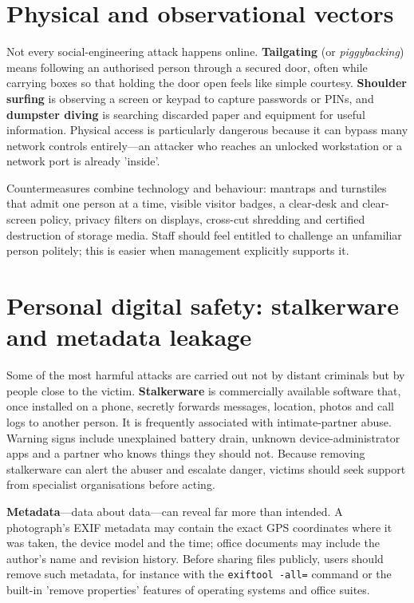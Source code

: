 \section{Physical and observational vectors}\label{sec:5.3}
Not every social-engineering attack happens online. \textbf{Tailgating} (or \emph{piggybacking}) means following an authorised person through a secured door, often while carrying boxes so that holding the door open feels like simple courtesy. \textbf{Shoulder surfing} is observing a screen or keypad to capture passwords or PINs, and \textbf{dumpster diving} is searching discarded paper and equipment for useful information. Physical access is particularly dangerous because it can bypass many network controls entirely—an attacker who reaches an unlocked workstation or a network port is already 'inside'.

Countermeasures combine technology and behaviour: mantraps and turnstiles that admit one person at a time, visible visitor badges, a clear-desk and clear-screen policy, privacy filters on displays, cross-cut shredding and certified destruction of storage media. Staff should feel entitled to challenge an unfamiliar person politely; this is easier when management explicitly supports it.

\section{Personal digital safety: stalkerware and metadata leakage}\label{sec:5.4}
Some of the most harmful attacks are carried out not by distant criminals but by people close to the victim. \textbf{Stalkerware} is commercially available software that, once installed on a phone, secretly forwards messages, location, photos and call logs to another person. It is frequently associated with intimate-partner abuse. Warning signs include unexplained battery drain, unknown device-administrator apps and a partner who knows things they should not. Because removing stalkerware can alert the abuser and escalate danger, victims should seek support from specialist organisations before acting.

\textbf{Metadata}—data about data—can reveal far more than intended. A photograph's EXIF metadata may contain the exact GPS coordinates where it was taken, the device model and the time; office documents may include the author's name and revision history. Before sharing files publicly, users should remove such metadata, for instance with the \texttt{exiftool -all=} command or the built-in 'remove properties' features of operating systems and office suites.

